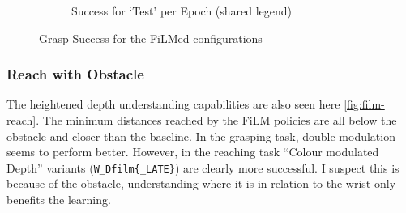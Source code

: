 \begin{figure}[H]
\begin{subfigure}{0.30\linewidth}
    \caption{Success for `Test' per Epoch (shared legend)}\label{subfig:film-grasp-test-success-epoochs}
  \end{subfigure}
  
  \caption{Grasp Success for the FiLMed configurations}\label{fig:film-grasp-success}
\end{figure}


\subsubsection{Reach with Obstacle}
The heightened depth understanding capabilities are also seen here \ref{fig:film-reach}. The minimum distances reached by the FiLM policies are all below the obstacle and closer than the baseline. In the grasping task, double modulation seems to perform better. However, in the reaching task ``Colour modulated Depth'' variants (\verb|W_Dfilm{_LATE}|) are clearly more successful. I suspect this is because of the obstacle, understanding where it is in relation to the wrist only benefits the learning.

